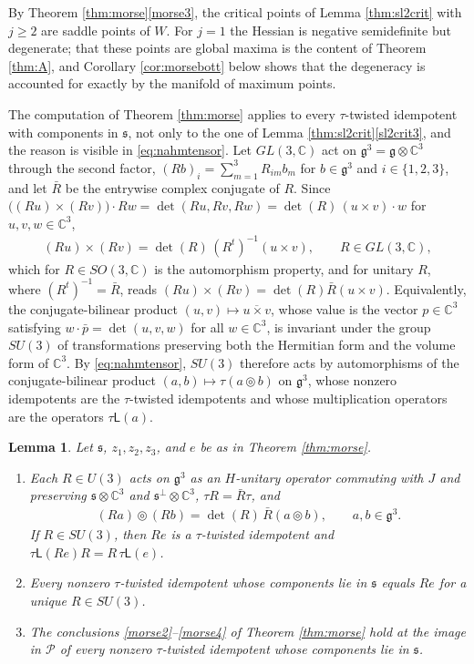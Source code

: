 \documentclass[leqno,10pt]{amsart}
\newtheorem{lemma}[theorem]{Lemma}%
\theoremstyle{definition}
\numberwithin{equation}{section}
\newcommand{\tmlt}{\circledcirc}
\newcommand{\lin}{\mathsf{L}}
\newcommand{\g}{\mathfrak{g}}
\newcommand{\com}{\mathbb C}
\newcommand{\subs}{\mathfrak{s}}
\begin{document}
By Theorem \ref{thm:morse}\ref{morse3}, the critical points of Lemma \ref{thm:sl2crit} with $j \geq 2$ are saddle points of $W$. For $j = 1$ the Hessian is negative semidefinite but degenerate; that these points are global maxima is the content of Theorem \ref{thm:A}, and Corollary \ref{cor:morsebott} below shows that the degeneracy is accounted for exactly by the manifold of maximum points.

The computation of Theorem \ref{thm:morse} applies to every $\tau$-twisted idempotent with components in $\subs$, not only to the one of Lemma \ref{thm:sl2crit}\ref{sl2crit3}, and the reason is visible in \eqref{eq:nahmtensor}. Let $GL(3, \com)$ act on $\g^{3} = \g \otimes \com^{3}$ through the second factor, $(Rb)_{i} = \sum_{m=1}^{3}R_{im}b_{m}$ for $b \in \g^{3}$ and $i \in \{1, 2, 3\}$, and let $\bar{R}$ be the entrywise complex conjugate of $R$. Since $\big((Ru) \times (Rv)\big) \cdot Rw = \det(Ru, Rv, Rw) = \det(R)\,(u \times v)\cdot w$ for $u, v, w \in \com^{3}$,
\begin{align}\label{eq:crossequivariance}
(Ru) \times (Rv) = \det(R)\,(R^{t})^{-1}(u \times v), \qquad R \in GL(3, \com),
\end{align}
which for $R \in SO(3, \com)$ is the automorphism property, and for unitary $R$, where $(R^{t})^{-1} = \bar{R}$, reads $(Ru) \times (Rv) = \det(R)\bar{R}(u \times v)$. Equivalently, the conjugate-bilinear product $(u, v) \mapsto \overline{u \times v}$, whose value is the vector $p \in \com^{3}$ satisfying $w \cdot \bar{p} = \det(u, v, w)$ for all $w \in \com^{3}$, is invariant under the group $SU(3)$ of transformations preserving both the Hermitian form and the volume form of $\com^{3}$. By \eqref{eq:nahmtensor}, $SU(3)$ therefore acts by automorphisms of the conjugate-bilinear product $(a, b) \mapsto \tau(a \tmlt b)$ on $\g^{3}$, whose nonzero idempotents are the $\tau$-twisted idempotents and whose multiplication operators are the operators $\tau\lin(a)$.
\begin{lemma}\label{lem:rotation}
Let $\subs$, $z_{1}, z_{2}, z_{3}$, and $e$ be as in Theorem \ref{thm:morse}.
\begin{enumerate}[label=(\arabic*), ref=(\arabic*)]
\item\label{rot1} Each $R \in U(3)$ acts on $\g^{3}$ as an $H$-unitary operator commuting with $J$ and preserving $\subs\otimes\com^{3}$ and $\subs^{\perp}\otimes\com^{3}$, $\tau R = \bar{R}\tau$, and
\begin{align}\label{eq:rotation}
(Ra) \tmlt (Rb) = \det(R)\,\bar{R}(a \tmlt b), \qquad a, b \in \g^{3}.
\end{align}
If $R \in SU(3)$, then $Re$ is a $\tau$-twisted idempotent and $\tau\lin(Re)R = R\,\tau\lin(e)$.
\item\label{rot2} Every nonzero $\tau$-twisted idempotent whose components lie in $\subs$ equals $Re$ for a unique $R \in SU(3)$.
\item\label{rot3} The conclusions \ref{morse2}--\ref{morse4} of Theorem \ref{thm:morse} hold at the image in $\mathcal{P}$ of every nonzero $\tau$-twisted idempotent whose components lie in $\subs$.
\end{enumerate}
\end{lemma}
\end{document}
